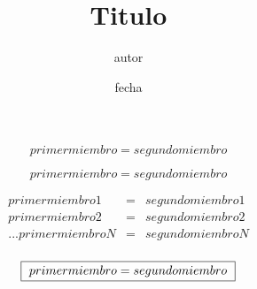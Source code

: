 \documentclass[a4paper]{article}
\title{Titulo}
\author{autor}
\date{fecha}
\begin{document}
 

	\begin{equation}
	primer miembro = segundo miembro
	\end{equation}

	$$
	primer miembro = segundo miembro
	$$

	$$
	\begin{array}{lcl}
		primer miembro 1   &   = 	& 	segundo miembro 1 \\
		primer miembro 2   &   = 	& 	segundo miembro 2 \\
		.
		.
		.
		primer miembro N   &   = 	& 	segundo miembro N \\
	\end{array}
	$$

	{\fboxsep 8pt\fboxrule 1pt
		\begin{equation}
			\fbox{
				$
				primer miembro = segundo miembro
				$
			}
		\end{equation}
	}
\end{document}
